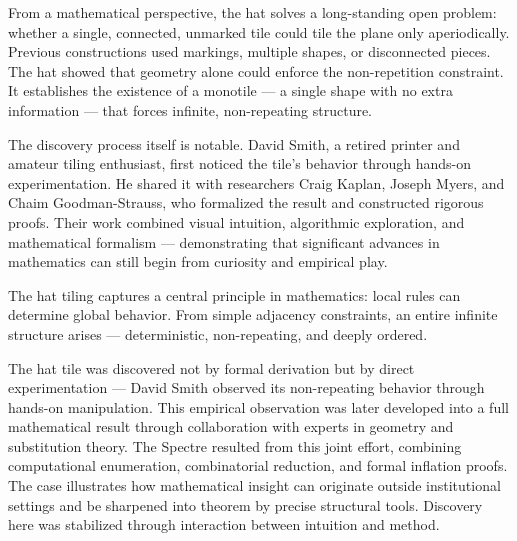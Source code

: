 From a mathematical perspective, the hat solves a long-standing open problem: whether a single, connected, unmarked tile could tile the plane only aperiodically. Previous constructions used markings, multiple shapes, or disconnected pieces. The hat showed that geometry alone could enforce the non-repetition constraint. It establishes the existence of a monotile — a single shape with no extra information — that forces infinite, non-repeating structure.

The discovery process itself is notable. David Smith, a retired printer and amateur tiling enthusiast, first noticed the tile’s behavior through hands-on experimentation. He shared it with researchers Craig Kaplan, Joseph Myers, and Chaim Goodman-Strauss, who formalized the result and constructed rigorous proofs. Their work combined visual intuition, algorithmic exploration, and mathematical formalism — demonstrating that significant advances in mathematics can still begin from curiosity and empirical play.

The hat tiling captures a central principle in mathematics: local rules can determine global behavior. From simple adjacency constraints, an entire infinite structure arises — deterministic, non-repeating, and deeply ordered.
\clearpage

\begin{commentary}
The hat tile was discovered not by formal derivation but by direct experimentation — David Smith observed its non-repeating behavior through hands-on manipulation. This empirical observation was later developed into a full mathematical result through collaboration with experts in geometry and substitution theory. The Spectre resulted from this joint effort, combining computational enumeration, combinatorial reduction, and formal inflation proofs. The case illustrates how mathematical insight can originate outside institutional settings and be sharpened into theorem by precise structural tools. Discovery here was stabilized through interaction between intuition and method.
\end{commentary}

